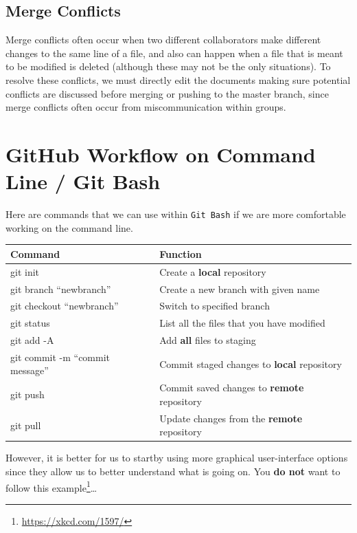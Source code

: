 \documentclass[12pt,]{krantz}
\begin{document}
\subsection{Merge Conflicts}\label{merge-conflicts}

Merge conflicts often occur when two different collaborators make
different changes to the same line of a file, and also can happen when a
file that is meant to be modified is deleted (although these may not be
the only situations). To resolve these conflicts, we must directly edit
the documents making sure potential conflicts are discussed before
merging or pushing to the master branch, since merge conflicts often
occur from miscommunication within groups.

\section{GitHub Workflow on Command Line / Git
Bash}\label{github-workflow-on-command-line-git-bash}

Here are commands that we can use within \texttt{Git\ Bash} if we are
more comfortable working on the command line.

\begin{longtable}[]{@{}ll@{}}
\toprule
Command & Function\tabularnewline
\midrule
\endhead
git init & Create a \textbf{local} repository\tabularnewline
git branch ``newbranch'' & Create a new branch with given
name\tabularnewline
git checkout ``newbranch'' & Switch to specified branch\tabularnewline
git status & List all the files that you have modified\tabularnewline
git add -A & Add \textbf{all} files to staging\tabularnewline
git commit -m ``commit message'' & Commit staged changes to
\textbf{local} repository\tabularnewline
git push & Commit saved changes to \textbf{remote}
repository\tabularnewline
git pull & Update changes from the \textbf{remote}
repository\tabularnewline
\bottomrule
\end{longtable}

However, it is better for us to startby using more graphical
user-interface options since they allow us to better understand what is
going on. You \textbf{do not} want to follow this example\footnote{\url{https://xkcd.com/1597/}}\ldots{}
\end{document}
